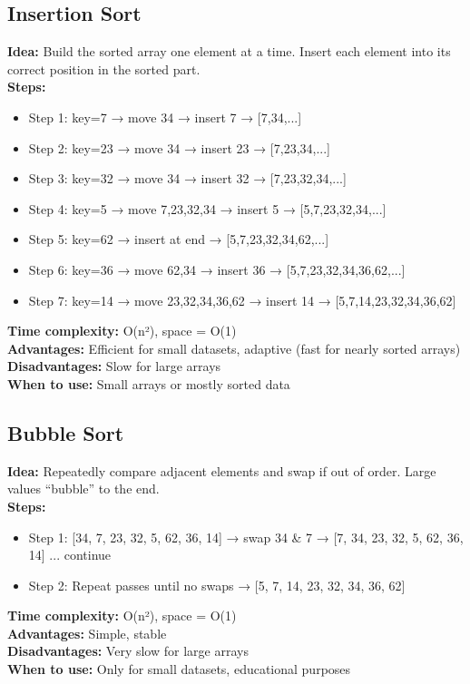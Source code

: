 \documentclass[a4paper,12pt]{article}
\begin{document}
\subsection{Insertion Sort}
\textbf{Idea:} Build the sorted array one element at a time. Insert each element into its correct position in the sorted part.  \\
\textbf{Steps:}  
\begin{itemize}
\item Step 1: key=7 → move 34 → insert 7 → [7,34,...]  
\item Step 2: key=23 → move 34 → insert 23 → [7,23,34,...]  
\item Step 3: key=32 → move 34 → insert 32 → [7,23,32,34,...]  
\item Step 4: key=5 → move 7,23,32,34 → insert 5 → [5,7,23,32,34,...]  
\item Step 5: key=62 → insert at end → [5,7,23,32,34,62,...]  
\item Step 6: key=36 → move 62,34 → insert 36 → [5,7,23,32,34,36,62,...]  
\item Step 7: key=14 → move 23,32,34,36,62 → insert 14 → [5,7,14,23,32,34,36,62]
\end{itemize}
\textbf{Time complexity:} O(n²), space = O(1)\\
\textbf{Advantages:} Efficient for small datasets, adaptive (fast for nearly sorted arrays)\\
\textbf{Disadvantages:} Slow for large arrays\\
\textbf{When to use:} Small arrays or mostly sorted data
\subsection{Bubble Sort}
\textbf{Idea:} Repeatedly compare adjacent elements and swap if out of order. Large values “bubble” to the end.  \\
\textbf{Steps:} 
\begin{itemize}
\item Step 1: [34, 7, 23, 32, 5, 62, 36, 14] → swap 34 & 7 → [7, 34, 23, 32, 5, 62, 36, 14] ... continue

\item Step 2: Repeat passes until no swaps → [5, 7, 14, 23, 32, 34, 36, 62]
\end{itemize}
\textbf{Time complexity:} O(n²), space = O(1)\\
\textbf{Advantages:} Simple, stable\\
\textbf{Disadvantages:} Very slow for large arrays\\
\textbf{When to use:} Only for small datasets, educational purposes
\end{document}

